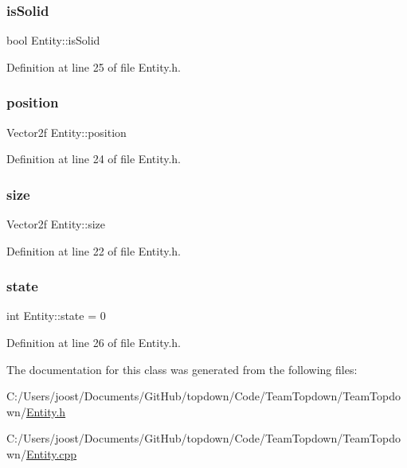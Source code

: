 \subsubsection{\texorpdfstring{is\+Solid}{isSolid}}
{\footnotesize\ttfamily bool Entity\+::is\+Solid}



Definition at line 25 of file Entity.\+h.

\mbox{\label{class_entity_a6af9d6498134ad0906011778bc5736db}} 
\subsubsection{\texorpdfstring{position}{position}}
{\footnotesize\ttfamily Vector2f Entity\+::position}



Definition at line 24 of file Entity.\+h.

\mbox{\label{class_entity_ae9a0a364c85f91ade5088b3610131417}} 
\subsubsection{\texorpdfstring{size}{size}}
{\footnotesize\ttfamily Vector2f Entity\+::size\hspace{0.3cm}{\ttfamily [protected]}}



Definition at line 22 of file Entity.\+h.

\mbox{\label{class_entity_a4edd9cc2506add0d9e27fade0bf957e8}} 
\subsubsection{\texorpdfstring{state}{state}}
{\footnotesize\ttfamily int Entity\+::state = 0}



Definition at line 26 of file Entity.\+h.



The documentation for this class was generated from the following files\+:\begin{DoxyCompactItemize}
\item 
C\+:/\+Users/joost/\+Documents/\+Git\+Hub/topdown/\+Code/\+Team\+Topdown/\+Team\+Topdown/\hyperlink{_entity_8h}{Entity.\+h}\item 
C\+:/\+Users/joost/\+Documents/\+Git\+Hub/topdown/\+Code/\+Team\+Topdown/\+Team\+Topdown/\hyperlink{_entity_8cpp}{Entity.\+cpp}\end{DoxyCompactItemize}
